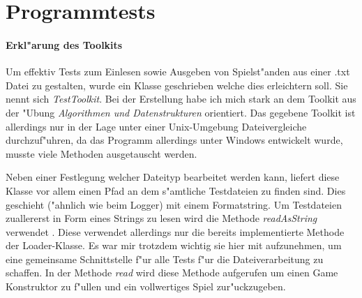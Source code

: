 \section{Programmtests}


\paragraph{Erkl"arung des Toolkits}
Um effektiv Tests zum Einlesen sowie Ausgeben von Spielst"anden aus einer .txt Datei zu gestalten, wurde ein Klasse geschrieben welche dies erleichtern soll. Sie nennt sich \emph{TestToolkit}. Bei der Erstellung habe ich mich stark an dem Toolkit aus der "Ubung \emph{Algorithmen und Datenstrukturen} orientiert. 
Das gegebene Toolkit ist allerdings nur in der Lage unter einer Unix-Umgebung Dateivergleiche durchzuf"uhren, da das Programm allerdings unter Windows entwickelt wurde, musste viele Methoden ausgetauscht werden. 

Neben einer Festlegung welcher Dateityp bearbeitet werden kann, liefert diese Klasse vor allem einen Pfad an dem s"amtliche Testdateien zu finden sind. Dies geschieht ("ahnlich wie beim Logger) mit einem Formatstring. Um Testdateien zuallererst in Form eines Strings zu lesen wird die Methode \emph{readAsString} verwendet . Diese verwendet allerdings nur die bereits implementierte Methode der Loader-Klasse. Es war mir trotzdem wichtig sie hier mit aufzunehmen, um eine gemeinsame Schnittstelle f"ur alle Tests f"ur die Dateiverarbeitung zu schaffen. In der Methode \emph{read} wird diese Methode aufgerufen um einen Game Konstruktor zu f"ullen und ein vollwertiges Spiel zur"uckzugeben. 

